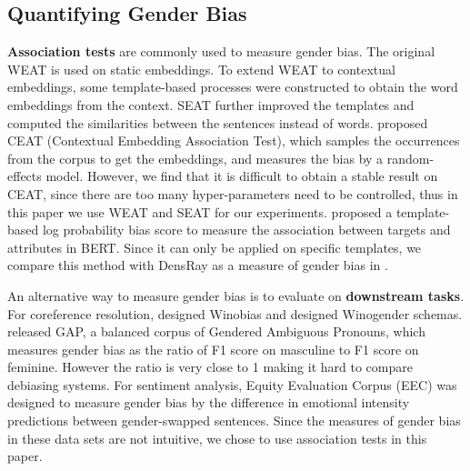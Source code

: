 \subsection{Quantifying Gender Bias}
\textbf{Association tests} are commonly used to measure
gender bias. The original WEAT is used on static
embeddings. To extend WEAT to contextual embeddings, some
template-based processes
\cite{karve2019conceptor,kurita2019measuring,Tan2019AssessingSA}
were constructed to obtain the word embeddings from the
context. SEAT further improved the templates and computed
the similarities between the sentences instead of
words.  proposed CEAT (Contextual
Embedding Association Test), which samples the occurrences
from the corpus to get the embeddings, and measures the bias
by a random-effects model. However, we find that it is
difficult to obtain a stable result on CEAT, since there are too many hyper-parameters need to be controlled, thus in this paper we  use WEAT and SEAT for our
experiments.  proposed a
template-based log probability bias score to measure the
association between targets and attributes in BERT. Since it
can only be applied on specific templates, we compare this
method with DensRay as a measure of gender bias in
.

An alternative way to measure gender bias is to evaluate on
\textbf{downstream tasks}. For coreference resolution,
 designed Winobias and
 designed Winogender
schemas.  released GAP, a balanced
corpus of Gendered Ambiguous Pronouns, which measures gender
bias as the ratio of F1 score on masculine to F1 score on
feminine. However the ratio is very close to 1
\cite{Chada_2019,Attree_2019} making it hard to compare
debiasing systems. For sentiment analysis, Equity Evaluation
Corpus (EEC) \cite{Kiritchenko_2018} was designed to measure
gender bias by the difference in emotional intensity
predictions between gender-swapped sentences. Since the
measures of gender bias in these data sets are not
intuitive, we chose to use association tests in
this paper.

